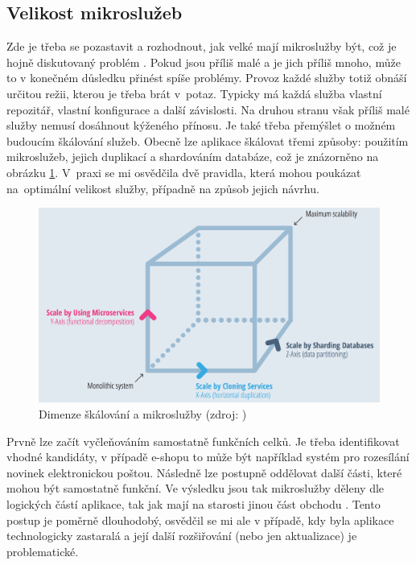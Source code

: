 \documentclass[FM,DP]{tulthesis}
\begin{document}
\subsection{Velikost mikroslužeb}

Zde je třeba se pozastavit a rozhodnout, jak velké mají mikroslužby být, což je hojně diskutovaný problém 
\cite[strana~13]{microservices}. Pokud jsou příliš malé a je jich příliš mnoho, může to v konečném důsledku 
přinést spíše problémy. Provoz každé služby totiž obnáší určitou režii, kterou je třeba brát v~potaz. Typicky 
má každá služba vlastní repozitář, vlastní konfigurace a další závislosti. Na druhou stranu však příliš malé 
služby nemusí dosáhnout kýženého přínosu. Je také třeba přemýšlet o možném budoucím škálování služeb. Obecně 
lze aplikace škálovat třemi způsoby: použitím mikroslužeb, jejich duplikací a shardováním databáze, což je
znázorněno na obrázku \ref{microservices-scale}. V~praxi se mi osvědčila dvě pravidla, která mohou poukázat 
na~optimální velikost služby, případně na způsob jejich návrhu.

\begin{figure}[h]
\center
\includegraphics[width=\textwidth]{microservices-scale.png}
\caption{Dimenze škálování a mikroslužby (zdroj: \cite[strana~10]{microservices})}
\label{microservices-scale}
\end{figure}

Prvně lze začít vyčleňováním samostatně funkčních celků. Je třeba identifikovat vhodné kandidáty, v případě e-shopu
to může být například systém pro rozesílání novinek elektronickou poštou. Následně lze postupně oddělovat další
části, které mohou být samostatně funkční. Ve výsledku jsou tak mikroslužby děleny dle logických částí
aplikace, tak jak mají na starosti jinou část obchodu \cite[strana~11]{microservices}. Tento postup je 
poměrně dlouhodobý, osvědčil se mi ale v případě, kdy byla aplikace technologicky zastaralá a její další rozšiřování
(nebo jen aktualizace) je problematické.
\end{document}
